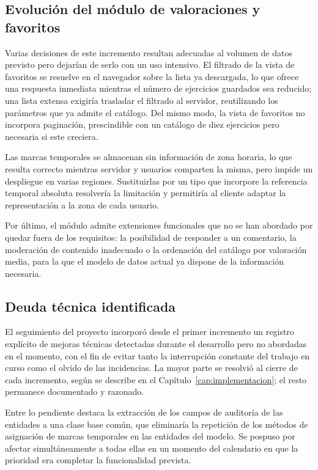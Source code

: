 \documentclass[12pt,a4paper,twoside,openright]{book}
\begin{document}
    \subsection{Evolución del módulo de valoraciones y favoritos}

    Varias decisiones de este incremento resultan adecuadas al volumen de datos
    previsto pero dejarían de serlo con un uso intensivo. El filtrado de la
    vista de favoritos se resuelve en el navegador sobre la lista ya
    descargada, lo que ofrece una respuesta inmediata mientras el número de
    ejercicios guardados sea reducido; una lista extensa exigiría trasladar el
    filtrado al servidor, reutilizando los parámetros que ya admite el
    catálogo. Del mismo modo, la vista de favoritos no incorpora paginación,
    prescindible con un catálogo de diez ejercicios pero necesaria si este
    creciera.

    Las marcas temporales se almacenan sin información de zona horaria, lo que
    resulta correcto mientras servidor y usuarios comparten la misma, pero
    impide un despliegue en varias regiones. Sustituirlas por un tipo que
    incorpore la referencia temporal absoluta resolvería la limitación y
    permitiría al cliente adaptar la representación a la zona de cada usuario.

    Por último, el módulo admite extensiones funcionales que no se han abordado
    por quedar fuera de los requisitos: la posibilidad de responder a un
    comentario, la moderación de contenido inadecuado o la ordenación del
    catálogo por valoración media, para la que el modelo de datos actual ya
    dispone de la información necesaria.

    \subsection{Deuda técnica identificada}

    El seguimiento del proyecto incorporó desde el primer incremento un
    registro explícito de mejoras técnicas detectadas durante el desarrollo
    pero no abordadas en el momento, con el fin de evitar tanto la
    interrupción constante del trabajo en curso como el olvido de las
    incidencias. La mayor parte se resolvió al cierre de cada incremento, según
    se describe en el Capítulo~\ref{cap:implementacion}; el resto permanece
    documentado y razonado.

    Entre lo pendiente destaca la extracción de los campos de auditoría de las
    entidades a una clase base común, que eliminaría la repetición de los
    métodos de asignación de marcas temporales en las entidades del
    modelo. Se pospuso por afectar simultáneamente a todas ellas en un momento
    del calendario en que la prioridad era completar la funcionalidad prevista.
\end{document}

